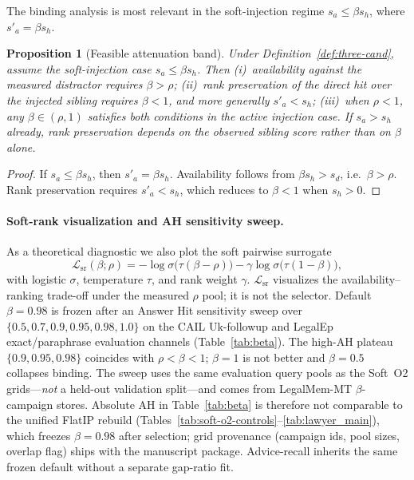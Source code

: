 \documentclass[preprint,12pt,authoryear]{elsarticle}
\newtheorem{proposition}{Proposition}
\begin{document}
The binding analysis is most relevant in the soft-injection regime $s_a\le\beta s_h$, where $s'_a=\beta s_h$.

\begin{proposition}[Feasible attenuation band]\label{prop:feasible}
Under Definition~\ref{def:three-cand}, assume the soft-injection case $s_a\le\beta s_h$.
Then (i)~availability against the measured distractor requires $\beta>\rho$; (ii)~rank preservation of the direct hit over the injected sibling requires $\beta<1$, and more generally $s'_a<s_h$; (iii)~when $\rho<1$, any $\beta\in(\rho,1)$ satisfies both conditions in the active injection case.
If $s_a>s_h$ already, rank preservation depends on the observed sibling score rather than on $\beta$ alone.
\end{proposition}

\begin{proof}
If $s_a\le\beta s_h$, then $s'_a=\beta s_h$.
Availability follows from $\beta s_h>s_d$, i.e.\ $\beta>\rho$.
Rank preservation requires $s'_a<s_h$, which reduces to $\beta<1$ when $s_h>0$.
\end{proof}

\paragraph{Soft-rank visualization and AH sensitivity sweep.}
As a theoretical diagnostic we also plot the soft pairwise surrogate
\begin{equation}\label{eq:softrank}
\mathcal{L}_{\mathrm{sr}}(\beta;\rho)
=-\log\sigma\!\bigl(\tau(\beta-\rho)\bigr)
-\gamma\log\sigma\!\bigl(\tau(1-\beta)\bigr),
\end{equation}
with logistic $\sigma$, temperature $\tau$, and rank weight $\gamma$.
$\mathcal{L}_{\mathrm{sr}}$ visualizes the availability--ranking trade-off under the measured $\rho$ pool; it is not the selector.
Default $\beta{=}0.98$ is frozen after an Answer Hit sensitivity sweep over $\{0.5,0.7,0.9,0.95,0.98,1.0\}$ on the CAIL Uk-followup and LegalEp exact/paraphrase evaluation channels (Table~\ref{tab:beta}).
The high-AH plateau $\{0.9,0.95,0.98\}$ coincides with $\rho{<}\beta{<}1$; $\beta{=}1$ is not better and $\beta{=}0.5$ collapses binding.
The sweep uses the same evaluation query pools as the Soft~O2 grids---\emph{not} a held-out validation split---and comes from LegalMem-MT $\beta$-campaign stores.
Absolute AH in Table~\ref{tab:beta} is therefore not comparable to the unified FlatIP rebuild (Tables~\ref{tab:soft-o2-controls}--\ref{tab:lawyer_main}), which freezes $\beta{=}0.98$ after selection; grid provenance (campaign ids, pool sizes, overlap flag) ships with the manuscript package.
Advice-recall inherits the same frozen default without a separate gap-ratio fit.
\end{document}
